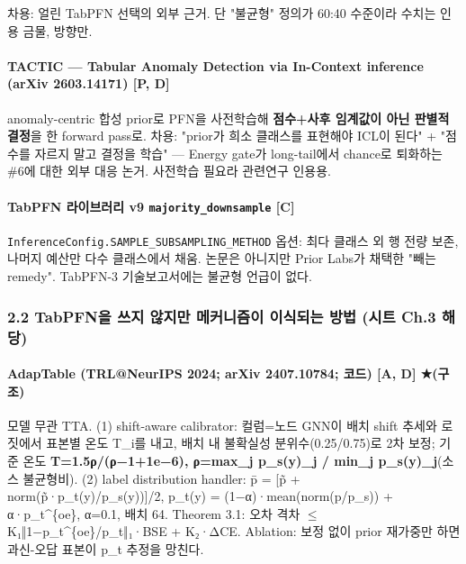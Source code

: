 \par\noindent \textbullet\enspace 차용: 얼린 TabPFN 선택의 외부 근거. 단 "불균형" 정의가 60:40 수준이라 수치는 인용 금물, 방향만.


\paragraph{TACTIC — Tabular Anomaly Detection via In-Context inference (arXiv 2603.14171) [P, D]}
\par\noindent \textbullet\enspace anomaly-centric 합성 prior로 PFN을 사전학습해 \textbf{점수+\allowbreak{}사후 임계값이 아닌 판별적 결정}을 한 forward pass로. 차용: "prior가 희소 클래스를 표현해야 ICL이 된다" +\allowbreak{} "점수를 자르지 말고 결정을 학습" — Energy gate가 long-tail에서 chance로 퇴화하는 \#6에 대한 외부 대응 논거. 사전학습 필요라 관련연구 인용용.


\paragraph{TabPFN 라이브러리 v9 \texttt{majority\allowbreak{}\_\allowbreak{}\allowbreak{}downsam\allowbreak{}ple} [C]}
\par\noindent \textbullet\enspace \texttt{Inferenc\allowbreak{}eConfig.\allowbreak{}SAMPLE\_\allowbreak{}\allowbreak{}S\allowbreak{}UBSAMPLI\allowbreak{}NG\_\allowbreak{}\allowbreak{}METHO\allowbreak{}D} 옵션: 최다 클래스 외 행 전량 보존, 나머지 예산만 다수 클래스에서 채움. 논문은 아니지만 Prior Labs가 채택한 "빼는 remedy". TabPFN-3 기술보고서에는 불균형 언급이 없다.


\subsubsection{2.2 TabPFN을 쓰지 않지만 메커니즘이 이식되는 방법 (시트 Ch.3 해당)}
\paragraph{AdapTable (TRL@NeurIPS 2024; arXiv 2407.10784; 코드) [A, D] ★(구조)}
\par\noindent \textbullet\enspace 모델 무관 TTA. (1) shift-aware calibrator: 컬럼=\allowbreak{}노드 GNN이 배치 shift 추세와 로짓에서 표본별 온도 T\_\allowbreak{}i를 내고, 배치 내 불확실성 분위수(0.25/\allowbreak{}0.75)로 2차 보정; 기준 온도 \textbf{T=\allowbreak{}1.5ρ/\allowbreak{}(ρ−1+\allowbreak{}1e−6), ρ=\allowbreak{}max\_\allowbreak{}j p\_\allowbreak{}s(y)\_\allowbreak{}j /\allowbreak{} min\_\allowbreak{}j p\_\allowbreak{}s(y)\_\allowbreak{}j}(소스 불균형비). (2) label distribution handler: p̄ =\allowbreak{} [p̃ +\allowbreak{} norm(p̃·p\_\allowbreak{}t(y)/\allowbreak{}p\_\allowbreak{}s(y))]/\allowbreak{}2, p\_\allowbreak{}t(y) =\allowbreak{} (1−α)·mean(norm(p/\allowbreak{}p\_\allowbreak{}s)) +\allowbreak{} α·p\_\allowbreak{}t\textasciicircum{}\{oe\}, α=\allowbreak{}0.1, 배치 64. Theorem 3.1: 오차 격차 \ensuremath{\leq} K₁‖1−p\_\allowbreak{}t\textasciicircum{}\{oe\}/\allowbreak{}p\_\allowbreak{}t‖₁·BSE +\allowbreak{} K₂·ΔCE. Ablation: 보정 없이 prior 재가중만 하면 과신-오답 표본이 p\_\allowbreak{}t 추정을 망친다.


